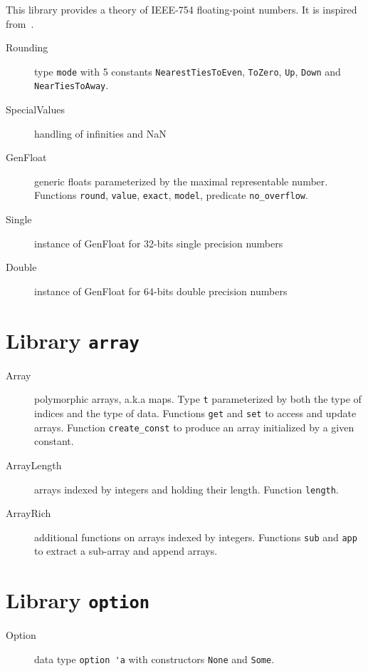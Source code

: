 This library provides a theory of IEEE-754 floating-point numbers. It
is inspired from~\cite{ayad10ijcar}.

\begin{description}
\item[Rounding] type \verb|mode| with 5 constants
  \verb|NearestTiesToEven|, \verb|ToZero|, \verb|Up|, \verb|Down| and
  \verb|NearTiesToAway|.
\item[SpecialValues] handling of infinities and NaN
\item[GenFloat] generic floats parameterized by the maximal
  representable number. Functions \verb|round|, \verb|value|,
  \verb|exact|, \verb|model|, predicate \verb|no_overflow|.
\item[Single] instance of GenFloat for 32-bits single precision numbers
\item[Double] instance of GenFloat for 64-bits double precision numbers
\end{description}


\section{Library \texttt{array}}

\begin{description}

\item[Array] polymorphic arrays, a.k.a maps. Type \verb|t|
  parameterized by both the type of indices and the type of
  data. Functions \verb|get| and \verb|set| to access and update
  arrays. Function \verb|create_const| to produce an array initialized
  by a given constant.

\item[ArrayLength] arrays indexed by integers and holding their
  length. Function \verb|length|.

\item[ArrayRich] additional functions on arrays indexed by
  integers. Functions \verb|sub| and \verb|app| to extract a sub-array
  and append arrays.

\end{description}

\section{Library \texttt{option}}

\begin{description}
\item[Option] data type \verb|option 'a| with constructors \verb|None| and
  \verb|Some|.
\end{description}


